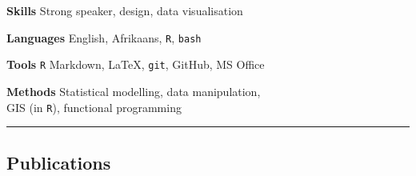 \documentclass[10pt]{article}
\begin{document}


\begin{multicols}{2} %



\columnbreak

\textbf{Skills   }     \hfill      Strong speaker, design, data visualisation

\textbf{Languages}     \hfill   English, Afrikaans, \texttt{R}, \texttt{bash}

\textbf{Tools    }     \hfill \texttt{R} Markdown, { \selectfont
                              \LaTeX}, \texttt{git}, GitHub, MS Office

\textbf{Methods  }     \hfill       Statistical modelling, data manipulation, \\
                       \hfill     GIS (in \texttt{R}), functional programming

\end{multicols} %

\hrule

\subsection*{Publications} %



\hrulefill
\end{document}
